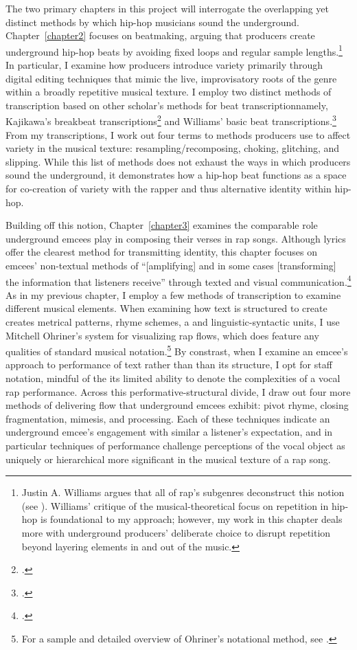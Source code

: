 The two primary chapters in this project will interrogate the overlapping yet distinct methods 
by which hip-hop musicians sound the underground. Chapter~\ref{chapter2} focuses on beatmaking,
arguing that producers create underground hip-hop beats by avoiding fixed loops and regular 
sample lengths.\footnote{
    Justin A. Williams argues that all of rap's subgenres deconstruct this notion 
    (see \cite{justinawilliamsBeatsFlowsResponse2009}). Williams' critique of the musical-theoretical
    focus on repetition in hip-hop is foundational to my approach; however, my work in this chapter 
    deals more with underground producers' deliberate choice to disrupt repetition beyond layering
    elements in and out of the music.} 
In particular, I examine how producers introduce variety primarily through digital editing 
techniques that mimic the live, improvisatory roots of the genre within a broadly repetitive 
musical texture. I employ two distinct methods of transcription based on other scholar's methods
for beat transcription\textemdash namely, Kajikawa's breakbeat transcriptions\footnote{
    \autocite[29--30 and 36--37]{lorenkajikawaSoundingRaceRap2015}.} 
and Williams' basic beat transcriptions.\footnote{
    \autocite[61ff]{justinawilliamsRhyminStealinMusical2013}.} 
From my transcriptions, I work out four terms to methods producers use to affect variety in 
the musical texture:  resampling/recomposing, choking, glitching, and slipping. While this list 
of methods does not exhaust the ways in which producers sound the underground, it demonstrates how 
a hip-hop beat functions as a space for co-creation of variety with the rapper and thus alternative
identity within hip-hop.

Building off this notion, Chapter~\ref{chapter3} examines the comparable role underground emcees play
in composing their verses in rap songs. Although lyrics offer the clearest method for transmitting 
identity, this chapter focuses on emcees' non-textual methods of ``[amplifying] and in some cases 
[transforming] the information that listeners receive'' through texted and visual 
communication.\footnote{
    \autocite[12]{lorenkajikawaSoundingRaceRap2015}.} 
As in my previous chapter, I employ a few methods of transcription to examine different musical
elements. When examining how text is structured to create creates metrical patterns, rhyme schemes, a
and linguistic-syntactic units, I use Mitchell Ohriner's system for visualizing rap flows, which does
feature any qualities of standard musical notation.\footnote{
    For a sample and detailed overview of Ohriner's notational method, see 
    \autocite[xxvii--xl]{mitchellohrinerFlowRhythmicVoice2019}.}
By constrast, when I examine an emcee's approach to performance of text rather than than its structure,
I opt for staff notation, mindful of the its limited ability to denote the complexities of a vocal 
rap performance. Across this performative-structural divide, I draw out four more methods of delivering
flow that underground emcees exhibit: pivot rhyme, closing fragmentation, mimesis, and processing.
Each of these techniques indicate an underground emcee's engagement with similar a listener's expectation,
and in particular techniques of performance challenge perceptions of the vocal object as uniquely or
hierarchical more significant in the musical texture of a rap song.
